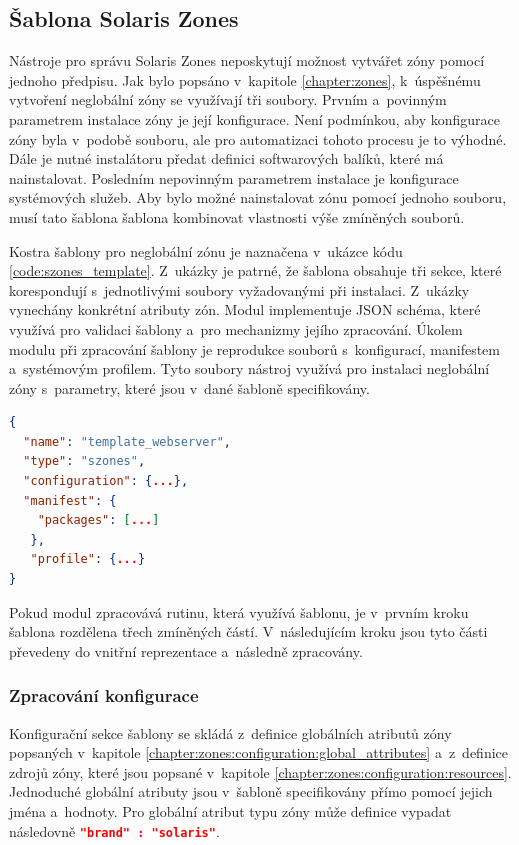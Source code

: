 \subsection{Šablona Solaris Zones}
\label{chapter:implementation:szones:template}
Nástroje pro správu Solaris Zones neposkytují možnost vytvářet zóny pomocí jednoho předpisu. Jak bylo popsáno v~kapitole
\ref{chapter:zones}, k~úspěšnému vytvoření neglobální zóny se využívají tři soubory. Prvním a~povinným parametrem instalace zóny
je její konfigurace. Není podmínkou, aby konfigurace zóny byla v~podobě souboru, ale pro automatizaci tohoto procesu je to výhodné.
Dále je nutné instalátoru předat definici softwarových balíků, které má nainstalovat. Posledním nepovinným parametrem instalace
je konfigurace systémových služeb. Aby bylo možné nainstalovat zónu pomocí jednoho souboru, musí tato šablona šablona kombinovat
vlastnosti výše zmíněných souborů. 

Kostra šablony pro neglobální zónu je naznačena v~ukázce kódu \ref{code:szones_template}. Z~ukázky je patrné, že šablona obsahuje
tři sekce, které korespondují s~jednotlivými soubory vyžadovanými při instalaci. Z~ukázky vynechány konkrétní atributy zón.
Modul implementuje JSON schéma, které využívá pro validaci šablony a~pro mechanizmy jejího zpracování. Úkolem modulu při zpracování
šablony je reprodukce souborů s~konfigurací, manifestem a~systémovým profilem. Tyto soubory nástroj využívá pro instalaci 
neglobální zóny s~parametry, které jsou v~dané šabloně specifikovány.
\begin{lstlisting}[language=json, caption={Kostra šablony neglobální zóny}, float,label={code:szones_template}]  
{  
  "name": "template_webserver",
  "type": "szones",
  "configuration": {...},
  "manifest": {
    "packages": [...]
   },
   "profile": {...} 
}
\end{lstlisting}
Pokud modul zpracovává rutinu, která využívá šablonu, je v~prvním kroku šablona rozdělena třech zmíněných částí.
V~následujícím kroku jsou tyto části převedeny do vnitřní reprezentace a~následně zpracovány.
\subsubsection{Zpracování konfigurace}
\label{chapter:implementation:szones:template:configuration}
Konfigurační sekce šablony se skládá z~definice globálních atributů zóny popsaných v~kapitole \ref{chapter:zones:configuration:global_attributes}
a~z~definice zdrojů zóny, které jsou popsané v~kapitole \ref{chapter:zones:configuration:resources}. Jednoduché globální atributy
jsou v~šabloně specifikovány přímo pomocí jejich jména a~hodnoty. Pro globální atribut typu zóny může definice vypadat 
následovně \lstinline[language=json]{"brand" : "solaris"}.

